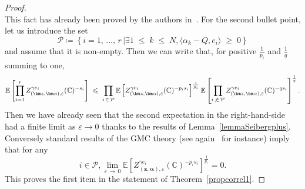 \documentclass[10pt]{amsart}
\theoremstyle{definition}\newtheorem{defi}[theo]{Definition}\newtheorem{rema}[theo]{Remark}\newtheorem{exam}[theo]{Example}\newtheorem{exem}[theo]{Example}\newtheorem{nota}[theo]{Notation}
\renewcommand{\leq}{\;\leqslant\;}
\renewcommand{\geq}{\;\geqslant\;}
\newcommand{\clP}{\mathcal{P}}
\newcommand{\C}{\mathbb{C}}
\newcommand{\E}{\mathbb{E}}
\newcommand{\ps}[1]{\langle #1 \rangle}
\newcommand*\eps{\varepsilon}
\let\oldexists\exists
\renewcommand*{\exists}{\mathrel{\oldexists}}
\begin{document}
\begin{proof}
\[\]
This fact has already been proved by the authors in~\cite[Lemma~3.3]{DKRV}. For the second bullet point, let us introduce the set 
\[
\clP\coloneqq \left\{i=1,\,\dots,\,r\,\vert\exists1\leq k\leq N,\ps{\alpha_k-Q,e_i}\geq 0\right\}
\]
and assume that it is non-empty. Then we can write that, for positive $\frac 1{p_i}$ and $\frac 1q$ summing to one,
\[
\E \left[\prod_{i=1}^{r} Z_{(\bm z,\bm \alpha), \eps}^{\gamma e_i} (\C)^{- s_i} \right]\leq \prod_{i\,\in\,\clP}\E \left [Z_{\left(\bm z,\bm \alpha\right), \eps}^{\gamma e_i} (\C)^{- p_is_i} \right]^{\frac1{p_i}}\E \left[\prod_{i\,\not\,\in\,\clP} Z_{\left(\bm z,\bm \alpha\right), \eps}^{\gamma e_i} (\C)^{- qs_i} \right]^{\frac1q}.
\]
Then we have already seen that the second expectation in the right-hand-side had a finite limit as $\eps\rightarrow0$ thanks to the results of Lemma~\ref{lemmaSeibergplus}. Conversely standard results of the GMC theory (see again~\cite[Lemma~3.3]{DKRV} for instance) imply that for any 
\[
i\in\clP, {\lim\limits_{\eps\,\to\,0}\E \left[Z_{(\bm z,\bm \alpha), \eps}^{\gamma e_i} (\C)^{- p_is_i} \right]^{\frac1{p_i}}=0}.
\]
This proves the first item in the statement of Theorem~\ref{propcorrel1}.


\end{proof}
\end{document}
